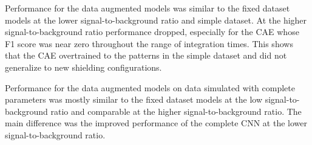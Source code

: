 Performance for the data augmented models was similar to the fixed dataset models at the lower signal-to-background ratio and simple dataset. At the higher signal-to-background ratio performance dropped, especially for the CAE whose F1 score was near zero throughout the range of integration times. This shows that the CAE overtrained to the patterns in the simple dataset and did not generalize to new shielding configurations.

Performance for the data augmented models on data simulated with complete parameters was mostly similar to the fixed dataset models at the low signal-to-background ratio and comparable at the higher signal-to-background ratio. The main difference was the improved performance of the complete CNN at the lower signal-to-background ratio.



